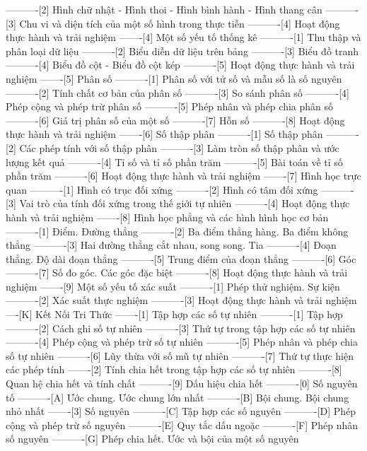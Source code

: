 ----------[2] Hình chữ nhật - Hình thoi - Hình bình hành - Hình thang cân
----------[3] Chu vi và diện tích của một số hình trong thực tiễn
----------[4] Hoạt động thực hành và trải nghiệm
-------[4] Một số yếu tố thống kê
----------[1] Thu thập và phân loại dữ liệu
----------[2] Biểu diễn dữ liệu trên bảng
----------[3] Biểu đồ tranh
----------[4] Biểu đồ cột - Biểu đồ cột kép
----------[5] Hoạt động thực hành và trải nghiệm
-------[5] Phân số
----------[1] Phân số với tử số và mẫu số là số nguyên
----------[2] Tính chất cơ bản của phân số
----------[3] So sánh phân số
----------[4] Phép cộng và phép trừ phân số
----------[5] Phép nhân và phép chia phân số
----------[6] Giá trị phân số của một số
----------[7] Hỗn số
----------[8] Hoạt động thực hành và trải nghiệm
-------[6] Số thập phân
----------[1] Số thập phân
----------[2] Các phép tính với số thập phân
----------[3] Làm tròn số thập phân và ước lượng kết quả
----------[4] Tỉ số và tỉ số phần trăm
----------[5] Bài toán về tỉ số phần trăm
----------[6] Hoạt động thực hành và trải nghiệm
-------[7] Hình học trực quan
----------[1] Hình có trục đối xứng
----------[2] Hình có tâm đối xứng
----------[3] Vai trò của tính đối xứng trong thế giới tự nhiên
----------[4] Hoạt động thực hành và trải nghiệm
-------[8] Hình học phẳng và các hình hình học cơ bản
----------[1] Điểm. Đường thẳng
----------[2] Ba điểm thẳng hàng. Ba điểm không thẳng
----------[3] Hai đường thẳng cắt nhau, song song. Tia
----------[4] Đoạn thẳng. Độ dài đoạn thẳng
----------[5] Trung điểm của đoạn thẳng
----------[6] Góc
----------[7] Số đo góc. Các góc đặc biệt
----------[8] Hoạt động thực hành và trải nghiệm
-------[9] Một số yếu tố xác suất
----------[1] Phép thử nghiệm. Sự kiện
----------[2] Xác suất thực nghiệm
----------[3] Hoạt động thực hành và trải nghiệm
----[K] Kết Nối Tri Thức
-------[1] Tập hợp các số tự nhiên
----------[1] Tập hợp
----------[2] Cách ghi số tự nhiên
----------[3] Thứ tự trong tập hợp các số tự nhiên
----------[4] Phép cộng và phép trừ số tự nhiên
----------[5] Phép nhân và phép chia số tự nhiên
----------[6] Lũy thừa với số mũ tự nhiên
----------[7] Thứ tự thực hiện các phép tính
-------[2] Tính chia hết trong tập hợp các số tự nhiên
----------[8] Quan hệ chia hết và tính chất
----------[9] Dấu hiệu chia hết
----------[0] Số nguyên tố
----------[A] Ước chung. Ước chung lớn nhất
----------[B] Bội chung. Bội chung nhỏ nhất
-------[3] Số nguyên
----------[C] Tập hợp các số nguyên
----------[D] Phép cộng và phép trừ số nguyên
----------[E] Quy tắc dấu ngoặc
----------[F] Phép nhân số nguyên
----------[G] Phép chia hết. Ước và bội của một số nguyên
